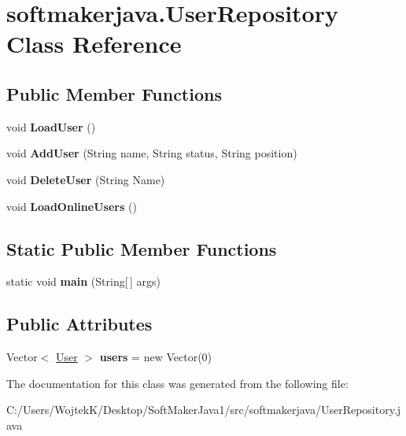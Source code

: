 \hypertarget{classsoftmakerjava_1_1_user_repository}{}\section{softmakerjava.\+User\+Repository Class Reference}
\label{classsoftmakerjava_1_1_user_repository}
\subsection*{Public Member Functions}
\begin{DoxyCompactItemize}
\item 
void {\bfseries Load\+User} ()\hypertarget{classsoftmakerjava_1_1_user_repository_a8af4cd8b22e04fb4daa66d2533e2ed7e}{}\label{classsoftmakerjava_1_1_user_repository_a8af4cd8b22e04fb4daa66d2533e2ed7e}

\item 
void {\bfseries Add\+User} (String name, String status, String position)\hypertarget{classsoftmakerjava_1_1_user_repository_aac2ef6e3d85131bab140abbcda29e4e2}{}\label{classsoftmakerjava_1_1_user_repository_aac2ef6e3d85131bab140abbcda29e4e2}

\item 
void {\bfseries Delete\+User} (String Name)\hypertarget{classsoftmakerjava_1_1_user_repository_a611f357a1bb5cf6b2cf49aab36452c61}{}\label{classsoftmakerjava_1_1_user_repository_a611f357a1bb5cf6b2cf49aab36452c61}

\item 
void {\bfseries Load\+Online\+Users} ()\hypertarget{classsoftmakerjava_1_1_user_repository_a79745f400ee62bb6adf9cf2901dfdedd}{}\label{classsoftmakerjava_1_1_user_repository_a79745f400ee62bb6adf9cf2901dfdedd}

\end{DoxyCompactItemize}
\subsection*{Static Public Member Functions}
\begin{DoxyCompactItemize}
\item 
static void {\bfseries main} (String\mbox{[}$\,$\mbox{]} args)\hypertarget{classsoftmakerjava_1_1_user_repository_a656cd4f239337a13475d244acc1cacca}{}\label{classsoftmakerjava_1_1_user_repository_a656cd4f239337a13475d244acc1cacca}

\end{DoxyCompactItemize}
\subsection*{Public Attributes}
\begin{DoxyCompactItemize}
\item 
Vector$<$ \hyperlink{classsoftmakerjava_1_1_user}{User} $>$ {\bfseries users} = new Vector(0)\hypertarget{classsoftmakerjava_1_1_user_repository_a02b286c04b3cebe586ad9de198669d0b}{}\label{classsoftmakerjava_1_1_user_repository_a02b286c04b3cebe586ad9de198669d0b}

\end{DoxyCompactItemize}


The documentation for this class was generated from the following file\+:\begin{DoxyCompactItemize}
\item 
C\+:/\+Users/\+Wojtek\+K/\+Desktop/\+Soft\+Maker\+Java1/src/softmakerjava/User\+Repository.\+java\end{DoxyCompactItemize}
